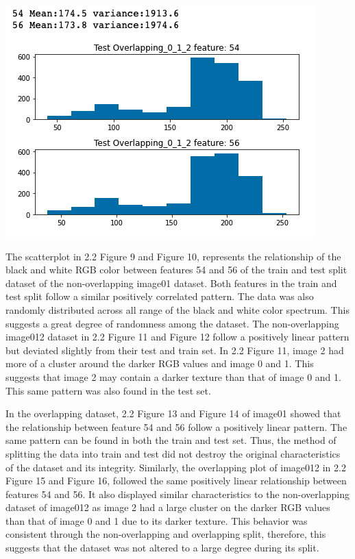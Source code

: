 \documentclass[12pt]{article}
\begin{document}
\begin{multicols*}{2}
\begin{center}
		\includegraphics[scale=0.3]{../screenshot/test_over_012.png}
		
	\end{center}

  \hspace*{5mm} The scatterplot in 2.2 Figure 9 and Figure 10, represents the relationship of the black and white RGB color between features 54 and 56 of the train
  and test split dataset of the non-overlapping image01 dataset. Both features in the train and test split follow a similar positively correlated pattern.
  The data was also randomly distributed across all range of the black and white color spectrum. This suggests a great degree of randomness among the dataset.
  The non-overlapping image012 dataset in 2.2 Figure 11 and Figure 12 follow a positively linear pattern but deviated slightly from their test and train set. 
  In 2.2 Figure 11, image 2 had more of a cluster around the darker RGB values and image 0 and 1. This suggests that image 2 may contain a darker texture than that of
  image 0 and 1. This same pattern was also found in the test set. 

  \hspace*{5mm} In the overlapping dataset, 2.2 Figure 13 and Figure 14 of image01 showed that the relationship between feature 54 and 56 follow a positively linear pattern.
  The same pattern can be found in both the train and test set. Thus, the method of splitting the data into train and test did not destroy the original characteristics
  of the dataset and its integrity. Similarly, the overlapping plot of image012 in 2.2 Figure 15 and Figure 16, followed the same positively linear relationship
  between features 54 and 56. It also displayed similar characteristics to the non-overlapping dataset of image012 as image 2 had a large cluster on the darker RGB 
  values than that of image 0 and 1 due to its darker texture. This behavior was consistent through the non-overlapping and overlapping split, therefore, this suggests
  that the dataset was not altered to a large degree during its split. 


\end{multicols*}
\end{document}
